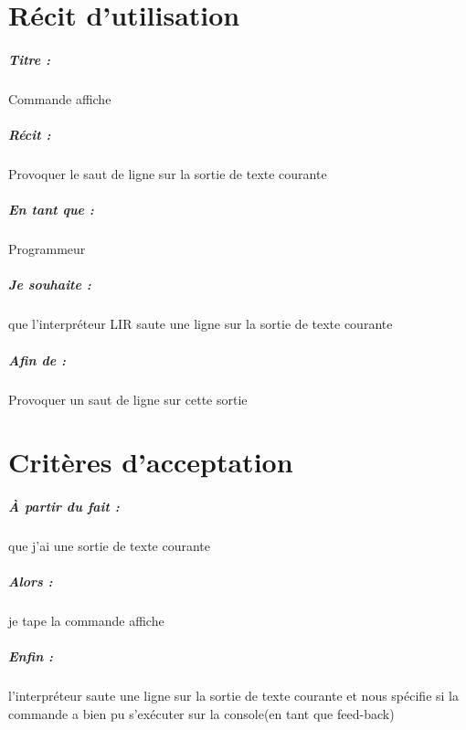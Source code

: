 \documentclass[12pt,a5paper, notitle, oneside]{report}
\begin{document}
	
	\chapter*{Récit d'utilisation}
	
	\paragraph{Titre : } Commande affiche
	\paragraph{Récit : }  Provoquer le saut de ligne sur la sortie de texte courante
	\paragraph{En tant que : } Programmeur
	\paragraph{Je souhaite : } que l'interpréteur LIR saute une ligne sur la sortie de texte courante
	\paragraph{Afin de : } Provoquer un saut de ligne sur cette sortie
	\newpage
	
	\chapter*{Critères d'acceptation}
	
	\paragraph{À partir du fait : } que j'ai une sortie de texte courante
	\paragraph{Alors : } je tape la commande affiche 
	\paragraph{Enfin : } l'interpréteur saute une ligne sur la sortie de texte courante et nous spécifie si la commande a bien pu s'exécuter sur la console(en tant que feed-back)
\end{document}
